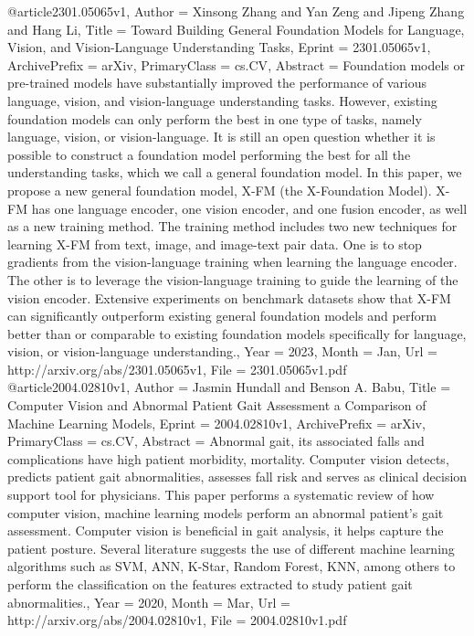 @article{2301.05065v1,
Author        = {Xinsong Zhang and Yan Zeng and Jipeng Zhang and Hang Li},
Title         = {Toward Building General Foundation Models for Language, Vision, and
  Vision-Language Understanding Tasks},
Eprint        = {2301.05065v1},
ArchivePrefix = {arXiv},
PrimaryClass  = {cs.CV},
Abstract      = {Foundation models or pre-trained models have substantially improved the
performance of various language, vision, and vision-language understanding
tasks. However, existing foundation models can only perform the best in one
type of tasks, namely language, vision, or vision-language. It is still an open
question whether it is possible to construct a foundation model performing the
best for all the understanding tasks, which we call a general foundation model.
In this paper, we propose a new general foundation model, X-FM (the
X-Foundation Model). X-FM has one language encoder, one vision encoder, and one
fusion encoder, as well as a new training method. The training method includes
two new techniques for learning X-FM from text, image, and image-text pair
data. One is to stop gradients from the vision-language training when learning
the language encoder. The other is to leverage the vision-language training to
guide the learning of the vision encoder. Extensive experiments on benchmark
datasets show that X-FM can significantly outperform existing general
foundation models and perform better than or comparable to existing foundation
models specifically for language, vision, or vision-language understanding.},
Year          = {2023},
Month         = {Jan},
Url           = {http://arxiv.org/abs/2301.05065v1},
File          = {2301.05065v1.pdf}
}
@article{2004.02810v1,
Author        = {Jasmin Hundall and Benson A. Babu},
Title         = {Computer Vision and Abnormal Patient Gait Assessment a Comparison of
  Machine Learning Models},
Eprint        = {2004.02810v1},
ArchivePrefix = {arXiv},
PrimaryClass  = {cs.CV},
Abstract      = {Abnormal gait, its associated falls and complications have high patient
morbidity, mortality. Computer vision detects, predicts patient gait
abnormalities, assesses fall risk and serves as clinical decision support tool
for physicians. This paper performs a systematic review of how computer vision,
machine learning models perform an abnormal patient's gait assessment. Computer
vision is beneficial in gait analysis, it helps capture the patient posture.
Several literature suggests the use of different machine learning algorithms
such as SVM, ANN, K-Star, Random Forest, KNN, among others to perform the
classification on the features extracted to study patient gait abnormalities.},
Year          = {2020},
Month         = {Mar},
Url           = {http://arxiv.org/abs/2004.02810v1},
File          = {2004.02810v1.pdf}
}

